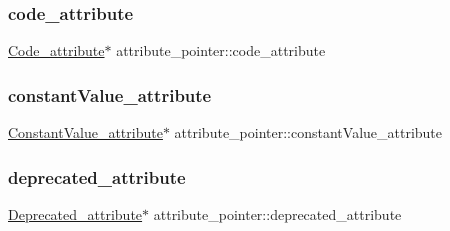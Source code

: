 \hypertarget{unionattribute__pointer_a620a646b296f0e4a073154c4fa366fbb}{}\label{unionattribute__pointer_a620a646b296f0e4a073154c4fa366fbb} 
\subsubsection{\texorpdfstring{code\+\_\+attribute}{code\_attribute}}
{\footnotesize\ttfamily \hyperlink{struct_code__attribute}{Code\+\_\+attribute}$\ast$ attribute\+\_\+pointer\+::code\+\_\+attribute}

\hypertarget{unionattribute__pointer_a8663de3142bac31a864348e70dfbf0d6}{}\label{unionattribute__pointer_a8663de3142bac31a864348e70dfbf0d6} 
\subsubsection{\texorpdfstring{constant\+Value\+\_\+attribute}{constantValue\_attribute}}
{\footnotesize\ttfamily \hyperlink{struct_constant_value__attribute}{Constant\+Value\+\_\+attribute}$\ast$ attribute\+\_\+pointer\+::constant\+Value\+\_\+attribute}

\hypertarget{unionattribute__pointer_af759696767b027a44ffbeafbf37f6de6}{}\label{unionattribute__pointer_af759696767b027a44ffbeafbf37f6de6} 
\subsubsection{\texorpdfstring{deprecated\+\_\+attribute}{deprecated\_attribute}}
{\footnotesize\ttfamily \hyperlink{struct_deprecated__attribute}{Deprecated\+\_\+attribute}$\ast$ attribute\+\_\+pointer\+::deprecated\+\_\+attribute}

\hypertarget{unionattribute__pointer_a2c54b10a006bbd4ed3ae83dbb1cdf8e9}{}\label{unionattribute__pointer_a2c54b10a006bbd4ed3ae83dbb1cdf8e9} 
